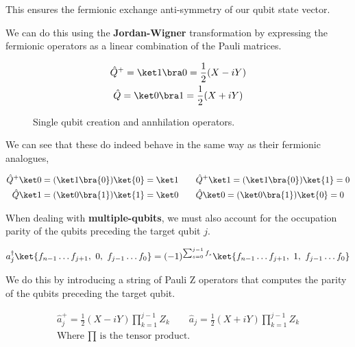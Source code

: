This ensures the fermionic exchange anti-symmetry of our qubit state vector.

We can do this using the \textbf{Jordan-Wigner} transformation by expressing the fermionic operators as a linear combination of the Pauli matrices.
\begin{figure}
    \begin{equation*}
    \begin{gathered}
        \hat Q^+ = \ket 1 \bra 0 = \frac{1}{2} (X - iY) \\
        \hat Q = \ket 0 \bra 1 = \frac{1}{2} (X + iY) 
    \end{gathered}
    \end{equation*}
    \caption{Single qubit creation and annhilation operators.}
\end{figure}

We can see that these do indeed behave in the same way as their fermionic analogues,

\begin{equation*}
\begin{gathered}
    \hat Q^+ \ket 0 = (\ket 1 \bra{0})\ket{0} = \ket 1 \qquad
    \hat Q^+ \ket 1 = (\ket 1 \bra{0})\ket{1} = 0 \\
    \hat Q \ket 1 = (\ket 0 \bra{1})\ket{1} = \ket 0 \qquad
    \hat Q \ket 0 = (\ket 0 \bra{1})\ket{0} = 0
\end{gathered}
\end{equation*}

When dealing with \textbf{multiple-qubits}, we must also account for the occupation parity of the qubits preceding the target qubit $j$.

\begin{equation*}
    a_j^\dagger \ket{f_{n-1} \dots f_{j+1},\,\, 0,\,\, f_{j-1} \dots f_0} =
    (-1)^{\sum_{s=0}^{j-1} f_s}
    \ket{f_{n-1} \dots f_{j+1},\,\, 1,\,\, f_{j-1} \dots f_0}
\end{equation*}

We do this by introducing a string of Pauli Z operators that computes the parity of the qubits preceding the target qubit.

\begin{equation*}
\begin{gathered}
    \hat a_j^+ = \frac{1}{2} (X - iY) \prod_{k=1}^{j-1} Z_k \qquad
    \hat a_j = \frac{1}{2} (X + iY) \prod_{k=1}^{j-1} Z_k \\
    \text{Where $\prod$ is the tensor product.}
\end{gathered}
\end{equation*}

